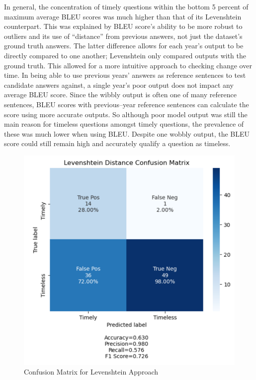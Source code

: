 \documentclass{article}
\begin{document}
In general, the concentration of timely questions within the bottom 5 percent of maximum average BLEU scores was much higher than that of its Levenshtein counterpart. This was explained by BLEU score’s ability to be more robust to outliers and its use of “distance” from previous answers, not just the dataset’s ground truth answers. The latter difference allows for each year’s output to be directly compared to one another; Levenshtein only compared outputs with the ground truth. This allowed for a more intuitive approach to checking change over time. In being able to use previous years’ answers as reference sentences to test candidate answers against, a single year’s poor output does not impact any average BLEU score. Since the wibbly output is often one of many reference sentences, BLEU scores with previous--year reference sentences can calculate the score using more accurate outputs. So although poor model output was still the main reason for timeless questions amongst timely questions, the prevalence of these was much lower when using BLEU. Despite one wobbly output, the BLEU score could still remain high and accurately qualify a question as timeless.





\begin{figure}[t!]
    \begin{center}
        \includegraphics[scale=0.5]{leven.PNG}
        \end{center}  
  \caption{Confusion Matrix for Levenshtein Approach}
  \label{fig:confusion_leven}
\end{figure}
\end{document}
